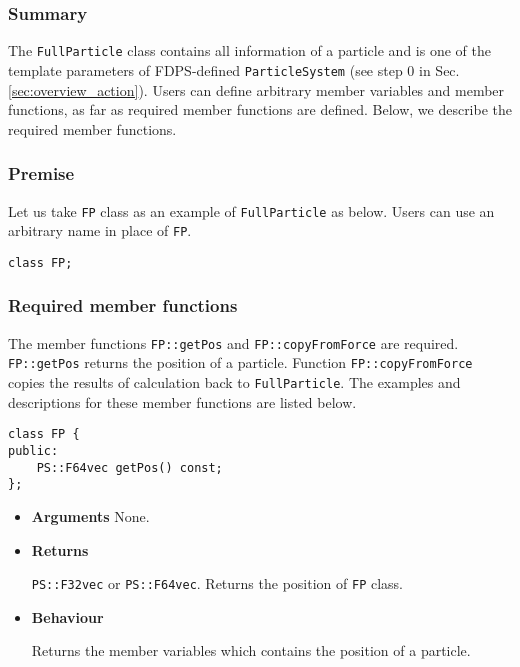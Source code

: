 \subsubsection{Summary}

The \texttt{FullParticle} class contains all information of a particle and is one of the template parameters of FDPS-defined \texttt{ParticleSystem} (see step 0 in Sec. \ref{sec:overview_action}). Users can define arbitrary member variables and member functions, as far as required member functions are defined. Below, we describe the required member functions.

\subsubsection{Premise}

Let us take \texttt{FP} class as an example of \texttt{FullParticle} as below. Users can use an arbitrary name in place of \texttt{FP}.
\begin{screen}
\begin{verbatim}
class FP;
\end{verbatim}
\end{screen}

\subsubsection{Required member functions}


The member functions \texttt{FP::getPos} and \texttt{FP::copyFromForce} are required. \texttt{FP::getPos} returns the position of a particle. Function \texttt{FP::copyFromForce} copies the results of calculation back to \texttt{FullParticle}. The examples and descriptions for these member functions are listed below.


\begin{screen}
\begin{verbatim}
class FP {
public:
    PS::F64vec getPos() const;
};
\end{verbatim}
\end{screen}

\begin{itemize}

\item {\bf Arguments}
  None.
  
\item {\bf Returns}

  \texttt{PS::F32vec} or \texttt{PS::F64vec}.
  Returns the position of \texttt{FP} class.
  
\item {\bf Behaviour}

  Returns the member variables which contains the position of a particle.

\end{itemize}

